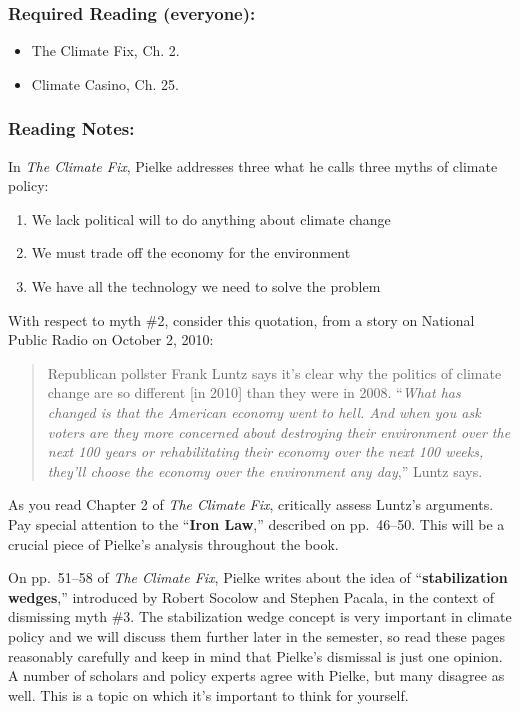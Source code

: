 \documentclass[
]{article}
\providecommand{\tightlist}{%
  \setlength{\itemsep}{0pt}\setlength{\parskip}{0pt}}
\begin{document}
\hypertarget{required-reading-everyone-17}{%
\subsubsection{Required Reading
(everyone):}\label{required-reading-everyone-17}}

\begin{itemize}
\tightlist
\item
  The Climate Fix, Ch. 2.
\item
  Climate Casino, Ch. 25.
\end{itemize}

\hypertarget{reading-notes-17}{%
\subsubsection{Reading Notes:}\label{reading-notes-17}}

In \emph{The Climate Fix}, Pielke addresses three what he calls three
myths of climate policy:

\begin{enumerate}
\def\labelenumi{\arabic{enumi}.}
\tightlist
\item
  We lack political will to do anything about climate change
\item
  We must trade off the economy for the environment
\item
  We have all the technology we need to solve the problem
\end{enumerate}

With respect to myth \#2, consider this quotation, from a story on
National Public Radio on October 2, 2010:

\begin{quote}
Republican pollster Frank Luntz says it's clear why the politics of
climate change are so different {[}in 2010{]} than they were in 2008.
``\emph{What has changed is that the American economy went to hell. And
when you ask voters are they more concerned about destroying their
environment over the next 100 years or rehabilitating their economy over
the next 100 weeks, they'll choose the economy over the environment any
day},'' Luntz says.
\end{quote}

As you read Chapter 2 of \emph{The Climate Fix}, critically assess
Luntz's arguments. Pay special attention to the ``\textbf{Iron Law},''
described on pp.~46--50. This will be a crucial piece of Pielke's
analysis throughout the book.

On pp.~51--58 of \emph{The Climate Fix}, Pielke writes about the idea of
``\textbf{stabilization wedges},'' introduced by Robert Socolow and
Stephen Pacala, in the context of dismissing myth \#3. The stabilization
wedge concept is very important in climate policy and we will discuss
them further later in the semester, so read these pages reasonably
carefully and keep in mind that Pielke's dismissal is just one opinion.
A number of scholars and policy experts agree with Pielke, but many
disagree as well. This is a topic on which it's important to think for
yourself.
\end{document}
